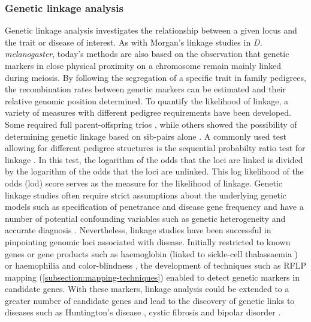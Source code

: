 \subsubsection{Genetic linkage analysis}
Genetic linkage analysis investigates the relationship between a given locus and the trait or disease of interest.  As with Morgan's linkage studies in \textit{D. melanogaster}, today's methods are also based on the observation that genetic markers in close physical proximity on a chromosome remain mainly linked during meiosis. By following the segregation of a specific trait in family pedigrees, the recombination rates between genetic markers can be estimated and their relative genomic position determined. To quantify the likelihood of linkage, a variety of measures with different pedigree requirements have been developed. Some required full parent-offspring trios \citep{Bernstein1930,Haldane1934}, while others showed the possibility of determining genetic linkage based on sib-pairs alone \citep{Penrose1935}. A commonly used test allowing for different pedigree structures is the sequential probabilty ratio test for linkage \citep{Morton1955,Pulst1999}. In this test, the logarithm of the odds that the loci are linked is divided by the logarithm of the odds that the loci are unlinked. This log likelihood of the odds (lod) score serves as the measure for the likelihood of linkage. Genetic linkage studies often require strict assumptions about the underlying genetic models such as specification of penetrance and disease gene frequency \citep{Morton1955,Pulst1999} and have a number of potential confounding variables such as genetic heterogeneity and accurate diagnosis \citep{Bird1993}. Nevertheless, linkage studies have been successful in pinpointing genomic loci associated with disease.  Initially restricted to known genes or gene products such as haemoglobin (linked to sickle-cell thalassaemia \citep{Ingram1959}) or haemophilia and color-blindness \citep{Haldane1947}, the development of techniques such as RFLP mapping (\cref{subsection:mapping-techniques}) enabled to detect genetic markers in candidate genes. With these markers, linkage analysis could be extended to a greater number of candidate genes and  lead to the discovery of genetic links to diseases such as Huntington's disease \citep{Gusella1983}, cystic fibrosis \citep{Kerem1989} and bipolar disorder \citep{Baron1987}. 

